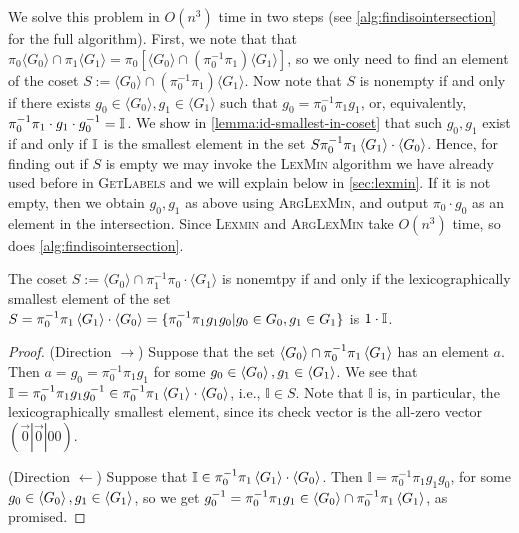 \begin{itemize}
        We solve this problem in $O(n^3)$ time in two steps (see \autoref{alg:findisointersection} for the full algorithm).
First, we note that that $\pi_0 \langle G_0 \rangle \cap \pi_1 \langle G_1 \rangle = \pi_0 [\langle G_0 \rangle \cap (\pi_0^{-1} \pi_1) \langle G_1 \rangle]$, so we only need to find an element of the coset $S:= \langle G_0 \rangle \cap (\pi_0^{-1} \pi_1) \langle G_1 \rangle$.
        Now note that $S$ is nonempty if and only if there exists $g_0 \in \langle G_0 \rangle, g_1 \in \langle G_1 \rangle$ such that $g_0 = \pi_0^{-1} \pi_1 g_1$, or, equivalently, $\pi_0^{-1} \pi_1 \cdot g_1 \cdot g_0^{-1} = \mathbb{I}_{}$.
        We show in \autoref{lemma:id-smallest-in-coset} that such $g_0, g_1$ exist if and only if $\mathbb{I}_{}$ is the smallest element in the set $S\pi_0^{-1}\pi_1\braket{G_1}\cdot\braket{G_0}$.
        Hence, for finding out if $S$ is empty we may invoke the \textsc{LexMin} algorithm we have already used before in \textsc{GetLabels} and we will explain below in \autoref{sec:lexmin}.
        If it is not empty, then we obtain $g_0, g_1$ as above using \textsc{ArgLexMin}, and output $\pi_0 \cdot g_0$ as an element in the intersection.
        Since \textsc{Lexmin} and \textsc{ArgLexMin} take $O(n^3)$ time, so does \autoref{alg:findisointersection}.
\end{itemize}

\begin{lemma}
    \label{lemma:id-smallest-in-coset}
    The coset $S:= \langle G_0 \rangle \cap \pi_1^{-1}\pi_0 \cdot \langle G_1 \rangle$ is nonemtpy if and only if the lexicographically smallest element of the set $S=\pi_0^{-1}\pi_1\braket{G_1}\cdot\braket{G_0}=\{\pi_0^{-1}\pi_1g_1g_0|g_0\in G_0,g_1\in G_1\}$ is $1 \cdot \mathbb{I}_{}$.
\end{lemma}
\begin{proof}
	(Direction $\rightarrow$)
	Suppose that the set $\braket{G_0}\cap \pi_0^{-1}\pi_1\braket{G_1}$ has an element $a$.
	Then $a=g_0=\pi_0^{-1}\pi_1g_1$ for some $g_0\in \braket{G_0},g_1\in\braket{G_1}$.
	We see that $\mathbb I=\pi_0^{-1}\pi_1g_1g_0^{-1}\in \pi_0^{-1}\pi_1\braket{G_1}\cdot \braket{G_0}$, i.e., $\mathbb I\in S$.
	Note that $\mathbb I$ is, in particular, the lexicographically smallest element, since its check vector is the all-zero vector $(\vec 0|\vec 0|00)$.
	
	(Direction $\leftarrow$)
	Suppose that $\mathbb I\in \pi_0^{-1}\pi_1\braket{G_1}\cdot\braket{G_0}$.
	Then $\mathbb I=\pi_0^{-1}\pi_1g_1g_0$, for some $g_0\in \braket{G_0},g_1\in\braket{G_1}$, so we get $g_0^{-1}=\pi_0^{-1}\pi_1g_1\in \braket{G_0}\cap \pi_0^{-1}\pi_1\braket{G_1}$, as promised.
\end{proof}

